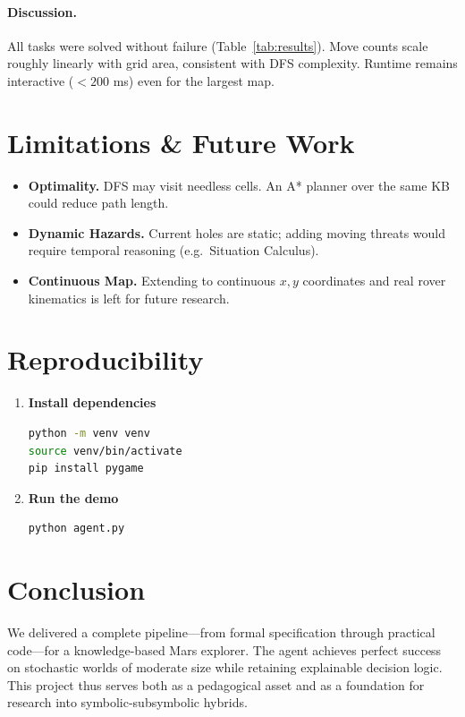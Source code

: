 \documentclass[12pt]{article}
\begin{document}
\paragraph{Discussion.}
All tasks were solved without failure (Table~\ref{tab:results}).
Move counts scale roughly linearly with grid area, consistent with DFS
complexity.
Runtime remains interactive ($<200$ ms) even for the largest map.

\section{Limitations \& Future Work}\label{sec:future}
\begin{itemize}
    \item \textbf{Optimality.}  DFS may visit needless cells.  An A* planner
          over the same KB could reduce path length.
    \item \textbf{Dynamic Hazards.}  Current holes are static; adding moving
          threats would require temporal reasoning (e.g.\ Situation Calculus).
    \item \textbf{Continuous Map.}  Extending to continuous $x,y$
          coordinates and real rover kinematics is left for future research.
\end{itemize}

\section{Reproducibility}\label{sec:reproduce}
\begin{enumerate}
    \item \textbf{Install dependencies}
\begin{lstlisting}[language=bash]
python -m venv venv
source venv/bin/activate
pip install pygame
\end{lstlisting}
    \item \textbf{Run the demo}
\begin{lstlisting}[language=bash]
python agent.py
\end{lstlisting}
\end{enumerate}

\section{Conclusion}\label{sec:conclusion}
We delivered a complete pipeline—from formal specification through practical
code—for a knowledge-based Mars explorer.
The agent achieves perfect success on stochastic worlds of moderate size
while retaining explainable decision logic.
This project thus serves both as a pedagogical asset and as a foundation for
research into symbolic-subsymbolic hybrids.
\end{document}
